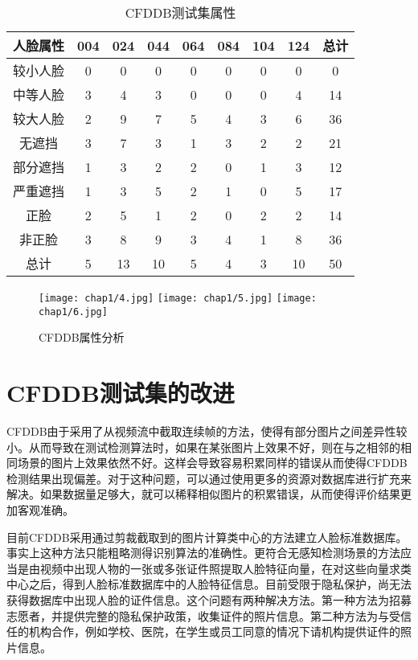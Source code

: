 \begin{table}[!hpb]
	\centering
	\caption
	{CFDDB测试集属性}
	\label{tab:cfddbal}
	\begin{tabular}{ c | ccccccc | c }
		\hline
		人脸属性 & 004 & 024 & 044 & 064 & 084 & 104 & 124 & 总计\\
		\hline
		较小人脸 & 0 & 0 & 0 & 0 & 0 & 0 & 0 & 0\\
		中等人脸 & 3 & 4 & 3 & 0 & 0 & 0 & 4 & 14\\
		较大人脸 & 2 & 9 & 7 & 5 & 4 & 3 & 6 & 36\\
		无遮挡   & 3 & 7 & 3 & 1 & 3 & 2 & 2 & 21\\
		部分遮挡 & 1 & 3 & 2 & 2 & 0 & 1 & 3 & 12\\
		严重遮挡 & 1 & 3 & 5 & 2 & 1 & 0 & 5 & 17\\
		正脸     & 2 & 5 & 1 & 2 & 0 & 2 & 2 & 14\\
		非正脸   & 3 & 8 & 9 & 3 & 4 & 1 & 8 & 36\\
		\hline
		总计 & 5 & 13 & 10 & 5 & 4 & 3 & 10 & 50\\
		\hline
	\end{tabular}
\end{table}

\begin{figure}[!htp]
	\centering
	{\texttt{[image: chap1/4.jpg]}}
	\hspace{4em}
	{\texttt{[image: chap1/5.jpg]}}
	\hspace{4em}
	{\texttt{[image: chap1/6.jpg]}}
	\caption{CFDDB属性分析}
	\label{fig:cfddbeval}
\end{figure}

\section{CFDDB测试集的改进}

CFDDB由于采用了从视频流中截取连续帧的方法，使得有部分图片之间差异性较小。从而导致在测试检测算法时，如果在某张图片上效果不好，则在与之相邻的相同场景的图片上效果依然不好。这样会导致容易积累同样的错误从而使得CFDDB检测结果出现偏差。对于这种问题，可以通过使用更多的资源对数据库进行扩充来解决。如果数据量足够大，就可以稀释相似图片的积累错误，从而使得评价结果更加客观准确。

目前CFDDB采用通过剪裁截取到的图片计算类中心的方法建立人脸标准数据库。事实上这种方法只能粗略测得识别算法的准确性。更符合无感知检测场景的方法应当是由视频中出现人物的一张或多张证件照提取人脸特征向量，在对这些向量求类中心之后，得到人脸标准数据库中的人脸特征信息。目前受限于隐私保护，尚无法获得数据库中出现人脸的证件信息。这个问题有两种解决方法。第一种方法为招募志愿者，并提供完整的隐私保护政策，收集证件的照片信息。第二种方法为与受信任的机构合作，例如学校、医院，在学生或员工同意的情况下请机构提供证件的照片信息。

